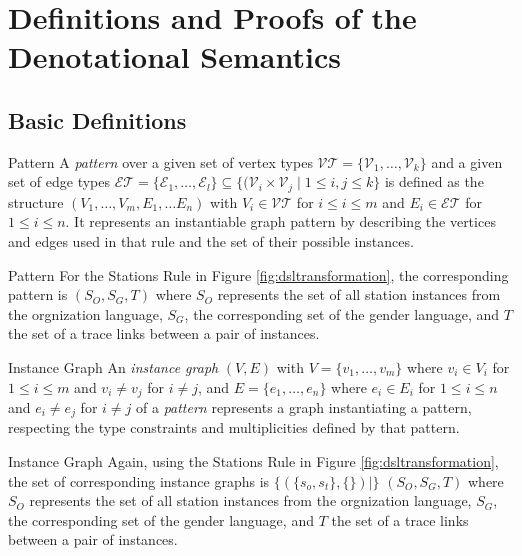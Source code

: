 \section{Definitions and Proofs of the Denotational Semantics}
\label{sec:proofs_denotation}

\subsection{Basic Definitions}

\begin{definition}{Pattern}
\label{def:rule_pattern}
A \emph{pattern} over a given set of vertex types $\mathcal{VT} = \{ \mathcal{V}_1,\dots,\mathcal{V}_k\}$ and a given set of edge types $\mathcal{ET} = \{ \mathcal{E}_1, \dots,\mathcal{E}_l \} \subseteq \{ (\mathcal{V}_i \times \mathcal{V}_j \mid 1 \leq i,j \leq k \}$ is defined as the structure $(V_1,\dots,V_m,E_1,\dots E_n)$ with $V_i \in \mathcal{VT}$ for $i \leq i \leq m$ and $E_i \in \mathcal{ET}$ for $1 \leq i \leq n$. It represents an instantiable graph pattern by describing the vertices and edges used in that rule and the set of their possible instances.
\end{definition}

\begin{example}{Pattern}
For the Stations Rule in Figure \ref{fig:dsltransformation}, the corresponding pattern is
$(S_O,S_G,T)$ where $S_O$ represents the set of all station instances from the orgnization language, $S_G$, the corresponding set of the gender language, and $T$ the set of a trace links between a pair of instances.
\end{example}

\begin{definition}{Instance Graph}
\label{def:instance_graph}
An \emph{instance graph} $(V,E)$ with $V = \{ v_1,\dots,v_m \}$ where $v_i \in V_i$ for $1 \leq i \leq m$ and $v_i \neq v_j$ for $i \neq j$, and $E = \{ e_1,\dots, e_n \}$ where $e_i \in E_i$ for $1 \leq i \leq n$ and $e_i \neq e_j$ for $i \neq j$ of a \emph{pattern} represents a graph instantiating a pattern, respecting the type constraints and multiplicities defined by that pattern.
\end{definition}

\begin{example}{Instance Graph}
Again, using the Stations Rule in Figure \ref{fig:dsltransformation}, the set of corresponding instance graphs is $\{ ( \{ s_o, s_t \} , \{  \} ) \mid \}$
$(S_O,S_G,T)$ where $S_O$ represents the set of all station instances from the orgnization language, $S_G$, the corresponding set of the gender language, and $T$ the set of a trace links between a pair of instances.
\end{example}


